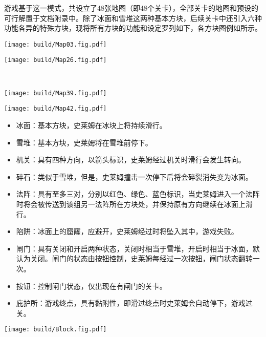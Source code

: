 游戏基于这一模式，共设立了48张地图（即48个关卡），全部关卡的地图和预设的可行解置于文档附录中。除了冰面和雪堆这两种基本方块，后续关卡中还引入六种功能各异的特殊方块，现将所有方块的功能和设定罗列如下，各方块图例如所示。
\begin{Figure}[游戏地图示例]
    \begin{FigureSub}[关卡03的地图]
        \texttt{[image: build/Map03.fig.pdf]}
    \end{FigureSub}
    \hspace{0.5cm}
    \begin{FigureSub}[关卡26的地图]
        \texttt{[image: build/Map26.fig.pdf]}
    \end{FigureSub}\\ \vspace{0.5cm}
    \begin{FigureSub}[关卡39的地图]
        \texttt{[image: build/Map39.fig.pdf]}
    \end{FigureSub}
    \hspace{0.5cm}
    \begin{FigureSub}[关卡42的地图]
        \texttt{[image: build/Map42.fig.pdf]}
    \end{FigureSub}
\end{Figure}

\begin{itemize}
    \item 冰面：基本方块，史莱姆在冰块上将持续滑行。
    \item 雪堆：基本方块，史莱姆将在雪堆前停下。
    \item 机关：具有四种方向，以箭头标识，史莱姆经过机关时滑行会发生转向。
    \item 碎石：类似于雪堆，但是，史莱姆撞击一次停下后将会碎裂消失变为冰面。
    \item 法阵：具有至多三对，分别以红色、绿色、蓝色标识，当史莱姆进入一个法阵时将会被传送到该组另一法阵所在方块处，并保持原有方向继续在冰面上滑行。
    \item 陷阱：冰面上的窟窿，应避开，史莱姆经过时将坠入其中，游戏失败。
    \item 闸门：具有关闭和开启两种状态，关闭时相当于雪堆，开启时相当于冰面，默认为关闭。闸门的状态由按钮控制，史莱姆每经过一次按钮，闸门状态翻转一次。
    \item 按钮：控制闸门状态，仅出现在有闸门的关卡。
    \item 庇护所：游戏终点，具有黏附性，即滑过终点时史莱姆会自动停下，游戏过关。
\end{itemize}
\begin{Figure}[游戏方块设计]
    \texttt{[image: build/Block.fig.pdf]}
\end{Figure}


